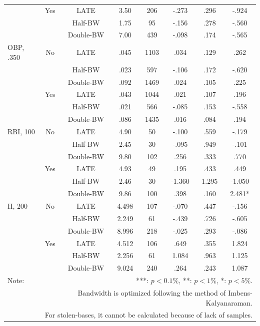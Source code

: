 \documentclass[dvipdfmx, 12pt]{article}
\begin{document}
\begin{table}[!]
\begin{tabular}{lccccccc}
    & Yes & LATE & 3.50  & 206 & -.273 & .296 & -.924\\
    & & Half-BW & 1.75 & 95 & -.156 & .278 & -.560 \\
    & & Double-BW & 7.00 & 439 & -.098 & .174 & -.565 \\ \hline

    OBP, .350 & No &LATE & .045 & 1103 & .034 & .129 & .262 \\
    & & Half-BW & .023 & 597 & -.106 & .172 & -.620 \\
    & & Double-BW & .092 & 1469 & .024 & .105 & .225 \\ \cline{3-8}

    & Yes & LATE & .043 & 1044 & .021 & .107 & .196 \\
    & & Half-BW & .021 & 566 & -.085 & .153 & -.558 \\
    & &Double-BW & .086 & 1435 & .016 & .084 & .194 \\ \hline

    RBI, 100 & No & LATE & 4.90 & 50 & -.100 & .559 & -.179 \\
    & &Half-BW & 2.45 & 30 & -.095 & .949 & -.101 \\
    & &Double-BW & 9.80 & 102 & .256 & .333 & .770 \\ \cline{3-8}

    & Yes & LATE & 4.93 & 49 & .195 & .433 & .449 \\
    & & Half-BW & 2.46 & 30 & -1.360 & 1.295 & -1.050 \\
    & & Double-BW & 9.86 & 100 & .398 & .160 & 2.481* \\ \hline

    H, 200& No & LATE & 4.498 & 107 & -.070 & .447 & -.156 \\
    & & Half-BW & 2.249 & 61 & -.439 & .726 & -.605 \\
    & & Double-BW & 8.996 & 218 & -.025 & .293 & -.086 \\ \cline{3-8}

    & Yes & LATE & 4.512 & 106 & .649 & .355 & 1.824 \\
    & & Half-BW & 2.256 & 61 & 1.084 & .963 & 1.125 \\
    & & Double-BW & 9.024 & 240 & .264 & .243 & 1.087 \\ \hline

    Note: & \multicolumn{7}{r}{***: $p<0.1\%$, **: $p<1\%$, *: $p<5\%$.} \\
    & \multicolumn{7}{r}{Bandwidth is optimized following the method of Imbens-Kalyanaraman.}　\\
    & \multicolumn{7}{r}{
    For stolen-bases, it cannot be calculated because of lack of samples.
    }
  \end{tabular}
\end{table}
\end{document}
